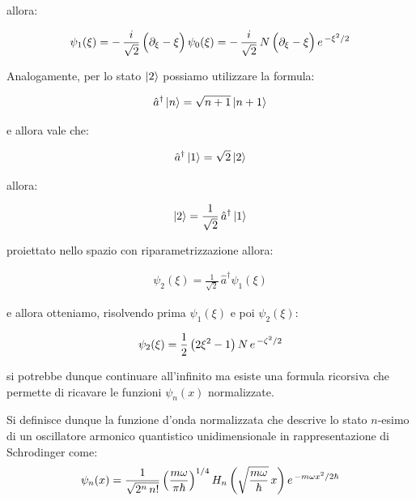 	allora:

\begin{align*}
	\psi_1(\xi) =  - \, \frac{i}{\sqrt{2}} \,  \qty\Big( \partial_{\xi} - \xi)  \, \psi_0(\xi) =   - \, \frac{i}{\sqrt{2}} \,  N \, \qty\Big( \partial_{\xi} - \xi) \, e^{\, -\xi^2/2}
\end{align*}

	Analogamente, per lo stato $\ket{2}$ possiamo utilizzare la formula:
	
\begin{align*}
	\hat{a}^{\dagger} \ket{n} = \sqrt{n+1} \ket{n+1} 
\end{align*}

	e allora vale che:

\begin{align*}
	\hat{a}^{\dagger} \ket{1} = \sqrt{2} \ket{2}
\end{align*}

	allora:
	
\begin{align*}
	\ket{2} = \frac{1}{\sqrt{2} } \,   \hat{a}^{\dagger} \ket{1}
\end{align*}

	proiettato nello spazio con riparametrizzazione allora:
	
\begin{align*}
	\psi_2(\xi) = \frac{1}{\sqrt{2}} \, \hat{a}^{\dagger} \psi_1(\xi)
\end{align*}

	e allora otteniamo, risolvendo prima $\psi_1(\xi)$ e poi $\psi_2(\xi)$:
	
\begin{align*}
	\psi_2(\xi) = \frac{1}{2} \, \qty( 2\xi^2 - 1) \, N \, e^{\, - \zeta^2/2}
\end{align*}

	si potrebbe dunque continuare all'infinito ma esiste una formula ricorsiva che permette di ricavare le funzioni $\psi_n(x)$ normalizzate.

\begin{mydef}
	Si definisce dunque la funzione d'onda normalizzata che descrive lo stato $n$-esimo di un oscillatore armonico quantistico unidimensionale in rappresentazione di Schrodinger come: 
\begin{align*}
	\psi_n(x) = \frac{1}{\sqrt{2^n \, n!}} \, \qty(\frac{m\omega}{\pi\hbar})^{1/4} \, H_n \,\qty(\sqrt{\frac{m\omega}{\hbar} }\, x) \, e^{\, - m\omega x^2/2\hbar}
\end{align*}
\end{mydef}
	
